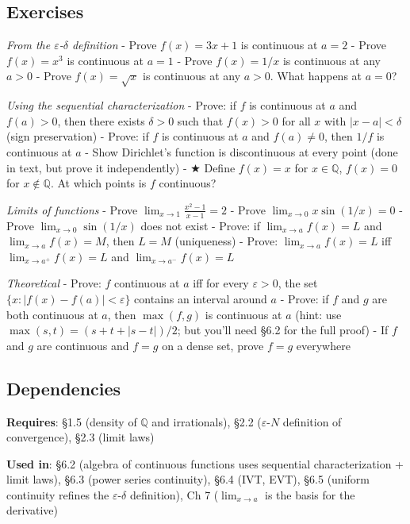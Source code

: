\documentclass[
  10pt,
  letterpaper,
]{scrbook}
\newcommand{\QQ}{\mathbb{Q}}
\begin{document}
\subsection{Exercises}\label{exercises-24}

\emph{From the \(\varepsilon\)-\(\delta\) definition} - Prove
\(f(x) = 3x + 1\) is continuous at \(a = 2\) - Prove \(f(x) = x^3\) is
continuous at \(a = 1\) - Prove \(f(x) = 1/x\) is continuous at any
\(a > 0\) - Prove \(f(x) = \sqrt{x}\) is continuous at any \(a > 0\).
What happens at \(a = 0\)?

\emph{Using the sequential characterization} - Prove: if \(f\) is
continuous at \(a\) and \(f(a) > 0\), then there exists \(\delta > 0\)
such that \(f(x) > 0\) for all \(x\) with \(|x - a| < \delta\) (sign
preservation) - Prove: if \(f\) is continuous at \(a\) and
\(f(a) \neq 0\), then \(1/f\) is continuous at \(a\) - Show Dirichlet's
function is discontinuous at every point (done in text, but prove it
independently) - ★ Define \(f(x) = x\) for \(x \in \QQ\), \(f(x) = 0\)
for \(x \notin \QQ\). At which points is \(f\) continuous?

\emph{Limits of functions} - Prove
\(\lim_{x \to 1} \frac{x^2 - 1}{x - 1} = 2\) - Prove
\(\lim_{x \to 0} x \sin(1/x) = 0\) - Prove \(\lim_{x \to 0} \sin(1/x)\)
does not exist - Prove: if \(\lim_{x \to a} f(x) = L\) and
\(\lim_{x \to a} f(x) = M\), then \(L = M\) (uniqueness) - Prove:
\(\lim_{x \to a} f(x) = L\) iff \(\lim_{x \to a^+} f(x) = L\) and
\(\lim_{x \to a^-} f(x) = L\)

\emph{Theoretical} - Prove: \(f\) continuous at \(a\) iff for every
\(\varepsilon > 0\), the set \(\{x : |f(x) - f(a)| < \varepsilon\}\)
contains an interval around \(a\) - Prove: if \(f\) and \(g\) are both
continuous at \(a\), then \(\max(f, g)\) is continuous at \(a\) (hint:
use \(\max(s, t) = (s + t + |s - t|)/2\); but you'll need §6.2 for the
full proof) - If \(f\) and \(g\) are continuous and \(f = g\) on a dense
set, prove \(f = g\) everywhere

\subsection{Dependencies}\label{dependencies-24}

\textbf{Requires}: §1.5 (density of \(\QQ\) and irrationals), §2.2
(\(\varepsilon\)-\(N\) definition of convergence), §2.3 (limit laws)

\textbf{Used in}: §6.2 (algebra of continuous functions uses sequential
characterization + limit laws), §6.3 (power series continuity), §6.4
(IVT, EVT), §6.5 (uniform continuity refines the
\(\varepsilon\)-\(\delta\) definition), Ch 7 (\(\lim_{x \to a}\) is the
basis for the derivative)
\end{document}
